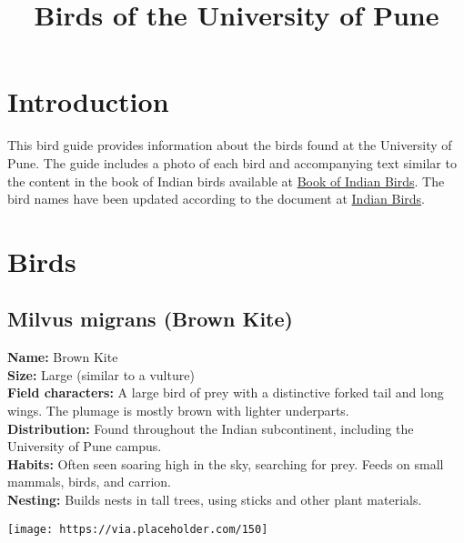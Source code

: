 \documentclass[a5paper,12pt]{memoir}
\title{Birds of the University of Pune}
\author{}
\date{}
\begin{document}
\maketitle

\tableofcontents

\chapter*{Introduction}
This bird guide provides information about the birds found at the University of Pune. The guide includes a photo of each bird and accompanying text similar to the content in the book of Indian birds available at \href{https://archive.org/download/BookOfIndianBirds/BookIndianBirds.pdf}{Book of Indian Birds}. The bird names have been updated according to the document at \href{https://indianbirds.in/pdfs/IB_11_5_6_Final.pdf}{Indian Birds}.

\chapter{Birds}

\section*{Milvus migrans (Brown Kite)}
\textbf{Name:} Brown Kite \\
\textbf{Size:} Large (similar to a vulture) \\
\textbf{Field characters:} A large bird of prey with a distinctive forked tail and long wings. The plumage is mostly brown with lighter underparts. \\
\textbf{Distribution:} Found throughout the Indian subcontinent, including the University of Pune campus. \\
\textbf{Habits:} Often seen soaring high in the sky, searching for prey. Feeds on small mammals, birds, and carrion. \\
\textbf{Nesting:} Builds nests in tall trees, using sticks and other plant materials. \\
\begin{flushright}
\texttt{[image: https://via.placeholder.com/150]}
\end{flushright}

\newpage
\end{document}
